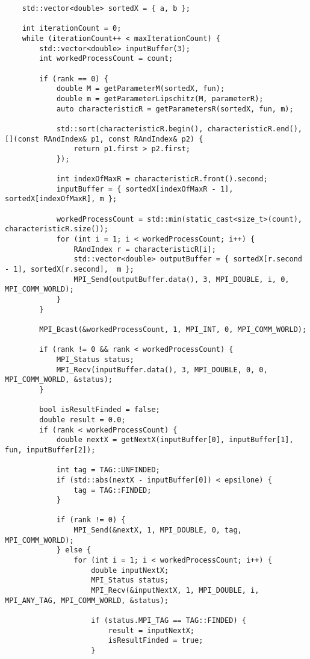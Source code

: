 \documentclass[14pt, a4paper]{extarticle}
\begin{document}
\begin{lstlisting}
    std::vector<double> sortedX = { a, b };

    int iterationCount = 0;
    while (iterationCount++ < maxIterationCount) {
        std::vector<double> inputBuffer(3);
        int workedProcessCount = count;

        if (rank == 0) {
            double M = getParameterM(sortedX, fun);
            double m = getParameterLipschitz(M, parameterR);
            auto characteristicR = getParametersR(sortedX, fun, m);

            std::sort(characteristicR.begin(), characteristicR.end(), [](const RAndIndex& p1, const RAndIndex& p2) {
                return p1.first > p2.first;
            });

            int indexOfMaxR = characteristicR.front().second;
            inputBuffer = { sortedX[indexOfMaxR - 1], sortedX[indexOfMaxR], m };

            workedProcessCount = std::min(static_cast<size_t>(count), characteristicR.size());
            for (int i = 1; i < workedProcessCount; i++) {
                RAndIndex r = characteristicR[i];
                std::vector<double> outputBuffer = { sortedX[r.second - 1], sortedX[r.second],  m };
                MPI_Send(outputBuffer.data(), 3, MPI_DOUBLE, i, 0, MPI_COMM_WORLD);
            }
        }

        MPI_Bcast(&workedProcessCount, 1, MPI_INT, 0, MPI_COMM_WORLD);

        if (rank != 0 && rank < workedProcessCount) {
            MPI_Status status;
            MPI_Recv(inputBuffer.data(), 3, MPI_DOUBLE, 0, 0, MPI_COMM_WORLD, &status);
        }

        bool isResultFinded = false;
        double result = 0.0;
        if (rank < workedProcessCount) {
            double nextX = getNextX(inputBuffer[0], inputBuffer[1], fun, inputBuffer[2]);

            int tag = TAG::UNFINDED;
            if (std::abs(nextX - inputBuffer[0]) < epsilone) {
                tag = TAG::FINDED;
            }

            if (rank != 0) {
                MPI_Send(&nextX, 1, MPI_DOUBLE, 0, tag, MPI_COMM_WORLD);
            } else {
                for (int i = 1; i < workedProcessCount; i++) {
                    double inputNextX;
                    MPI_Status status;
                    MPI_Recv(&inputNextX, 1, MPI_DOUBLE, i, MPI_ANY_TAG, MPI_COMM_WORLD, &status);

                    if (status.MPI_TAG == TAG::FINDED) {
                        result = inputNextX;
                        isResultFinded = true;
                    }


\end{lstlisting}
\end{document}
